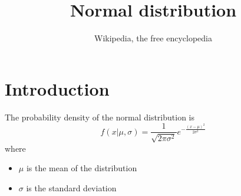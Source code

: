 \documentclass{article}
\title{Normal distribution}
\author{Wikipedia, the free encyclopedia}
\begin{document}
\maketitle
\section{Introduction}
The probability density of the normal
distribution is
\begin{equation}
  f(x|\mu, \sigma)
  = \frac{1}{\sqrt{2\pi\sigma^2}}
  e^{-\frac{(x-\mu)^2}{2\sigma^2}}
\end{equation}
where
\begin{itemize}
  \item $\mu$ is the mean of the distribution
  \item $\sigma$ is the standard deviation
\end{itemize}
\end{document}
